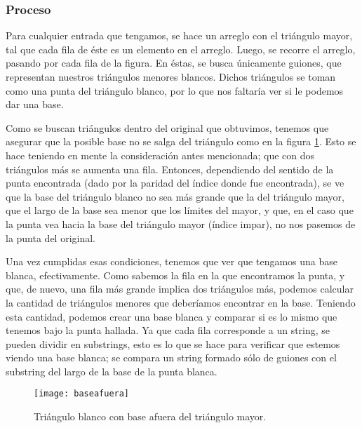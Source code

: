 \documentclass[letterpaper]{article}
\begin{document}
\subsubsection{Proceso}
Para cualquier entrada que tengamos, se hace un arreglo con el tri\'angulo mayor,
tal que cada fila de \'este es un elemento en el arreglo. Luego, se recorre el
arreglo, pasando por cada fila de la figura. En \'estas, se busca \'unicamente guiones,
que representan nuestros tri\'angulos menores blancos. Dichos tri\'angulos se toman
como una punta del tri\'angulo blanco, por lo que nos faltar\'ia ver si le podemos
dar una base.\par
Como se buscan tri\'angulos dentro del original que obtuvimos, tenemos que asegurar
que la posible base no se salga del tri\'angulo como en la figura \ref{fig:baseafuera}.
Esto se hace teniendo en mente la consideraci\'on antes mencionada; que con dos
tri\'angulos m\'as se aumenta una fila. Entonces, dependiendo del sentido de la
punta encontrada (dado por la paridad del \'indice donde fue encontrada), se ve
que la base del tri\'angulo blanco no sea m\'as grande que la del tri\'angulo
mayor, que el largo de la base sea menor que los l\'imites del mayor, y que, en
el caso que la punta vea hacia la base del tri\'angulo mayor (\'indice impar), no
nos pasemos de la punta del original.\par
Una vez cumplidas esas condiciones, tenemos que ver que tengamos una base blanca,
efectivamente. Como sabemos la fila en la que encontramos la punta, y que, de nuevo,
una fila m\'as grande implica dos tri\'angulos m\'as, podemos calcular la cantidad
de tri\'angulos menores que deber\'iamos encontrar en la base. Teniendo esta
cantidad, podemos crear una base blanca y comparar si es lo mismo que tenemos bajo
la punta hallada. Ya que cada fila corresponde a un string, se pueden dividir en
substrings, esto es lo que se hace para verificar que estemos viendo una base
blanca; se compara un string formado s\'olo de guiones con el substring del largo
de la base de la punta blanca.
  \begin{figure}[t!]
    \centering
    \texttt{[image: baseafuera]}
    \caption{Tri\'angulo blanco con base afuera del tri\'angulo mayor.}
    \label{fig:baseafuera}
  \end{figure}
\end{document}
